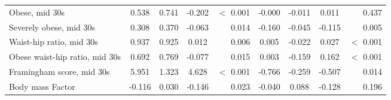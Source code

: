 \begin{tabular}{l c c c r c c c r}
Obese, mid 30s & 0.538 & 0.741 & -0.202 & $ < $ 0.001 & -0.000 & -0.011 & 0.011 & 0.437 \\
Severely obese, mid 30s & 0.308 & 0.370 & -0.063 & 0.014 & -0.160 & -0.045 & -0.115 & 0.005 \\
Waist-hip ratio, mid 30s & 0.937 & 0.925 & 0.012 & 0.006 & 0.005 & -0.022 & 0.027 & $ < $ 0.001 \\
Obese waist-hip ratio, mid 30s & 0.692 & 0.769 & -0.077 & 0.015 & 0.003 & -0.159 & 0.162 & $ < $ 0.001 \\
Framingham score, mid 30s & 5.951 & 1.323 & 4.628 & $ < $ 0.001 & -0.766 & -0.259 & -0.507 & 0.014 \\
Body mass Factor & -0.116 & 0.030 & -0.146 & 0.023 & -0.040 & 0.088 & -0.128 & 0.196 \\
\bottomrule
\end{tabular}
